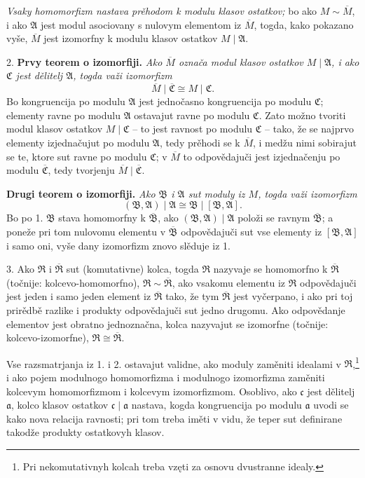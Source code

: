 \documentclass[11pt]{article}
\providecommand{\mR}{\mathfrak{R}}
\providecommand{\mA}{\mathfrak{A}}
\providecommand{\mB}{\mathfrak{B}}
\providecommand{\mC}{\mathfrak{C}}
\providecommand{\ma}{\mathfrak{a}}
\providecommand{\mc}{\mathfrak{c}}
\begin{document}
\emph{Vsaky homomorfizm nastava prěhodom k modulu klasov ostatkov;} bo ako $M\sim\overline M$, i ako $\mA$ jest modul asociovany s nulovym elementom iz $\overline M$, togda, kako pokazano vyše, $\overline M$ jest izomorfny k modulu klasov ostatkov $M\mid\mA$.

2. \textbf{Prvy teorem o izomorfiji.} \emph{Ako $\overline M$ označa modul klasov ostatkov $M\mid\mA$, i ako $\mC$ jest dělitelj $\mA$, togda važi izomorfizm
\[
\overline M\mid\overline{\mC}\cong M\mid\mC .
\]}
Bo kongruencija po modulu $\mA$ jest jednočasno kongruencija po modulu $\mC$; elementy ravne po modulu $\mA$ ostavajut ravne po modulu $\mC$. Zato možno tvoriti modul klasov ostatkov $M\mid\mC$ -- to jest ravnost po modulu $\mC$ -- tako, že se najprvo elementy izjednačujut po modulu $\mA$, tedy prěhodi se k $\overline M$, i medžu nimi sobirajut se te, ktore sut ravne po modulu $\mC$; v $\overline M$ to odpovědajuči jest izjednačenju po modulu $\overline{\mC}$, tedy tvorjenju $\overline M\mid\overline{\mC}$.

\textbf{Drugi teorem o izomorfiji.} \emph{Ako $\mB$ i $\mA$ sut moduly iz $M$, togda važi izomorfizm
\[
(\mB,\mA)\mid\mA\cong \mB\mid[\mB,\mA].
\]}
Bo po 1. $\mB$ stava homomorfny k $\overline{\mB}$, ako $(\mB,\mA)\mid\mA$ položi se ravnym $\overline{\mB}$; a poneže pri tom nulovomu elementu v $\overline{\mB}$ odpovědajuči sut vse elementy iz $[\mB,\mA]$ i samo oni, vyše dany izomorfizm znovo slěduje iz 1.

3. Ako $\mR$ i $\overline{\mR}$ sut (komutativne) kolca, togda $\mR$ nazyvaje se homomorfno k $\overline{\mR}$ (točnije: kolcevo-homomorfno), $\mR\sim\overline{\mR}$, ako vsakomu elementu iz $\mR$ odpovědajuči jest jeden i samo jeden element iz $\overline{\mR}$ tako, že tym $\overline{\mR}$ jest vyčerpano, i ako pri toj prirědbě razlike i produkty odpovědajuči sut jedno drugomu. Ako odpovědanje elementov jest obratno jednoznačna, kolca nazyvajut se izomorfne (točnije: kolcevo-izomorfne), $\mR\cong\overline{\mR}$.

Vse razsmatrjanja iz 1. i 2. ostavajut validne, ako moduly zaměniti idealami v $\mR$,\footnote{Pri nekomutativnyh kolcah treba vzęti za osnovu dvustranne idealy.} i ako pojem modulnogo homomorfizma i modulnogo izomorfizma zaměniti kolcevym homomorfizmom i kolcevym izomorfizmom. Osoblivo, ako $\mc$ jest dělitelj $\ma$, kolco klasov ostatkov $\mc\mid\ma$ nastava, kogda kongruencija po modulu $\ma$ uvodi se kako nova relacija ravnosti; pri tom treba iměti v vidu, že teper sut definirane takodže produkty ostatkovyh klasov.
\end{document}
